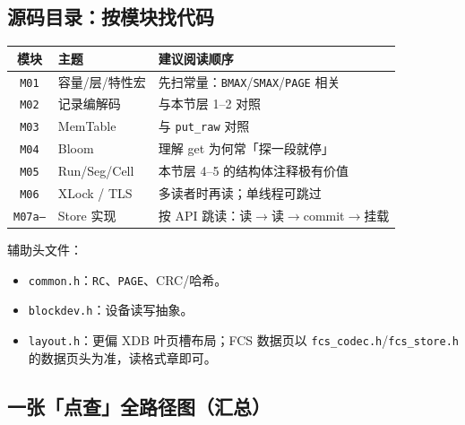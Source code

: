 \subsection{源码目录：按模块找代码}
\label{sec:cd-modules}

\begin{center}
\small
\begin{tabular}{@{}clp{8.4cm}@{}}
\toprule
模块 & 主题 & 建议阅读顺序 \\
\midrule
\texttt{M01} & 容量/层/特性宏 & 先扫常量：\texttt{BMAX}/\texttt{SMAX}/\texttt{PAGE} 相关 \\
\texttt{M02} & 记录编解码 & 与本节层 1--2 对照 \\
\texttt{M03} & MemTable & 与 \texttt{put\_raw} 对照 \\
\texttt{M04} & Bloom & 理解 get 为何常「探一段就停」 \\
\texttt{M05} & Run/Seg/Cell & 本节层 4--5 的结构体注释极有价值 \\
\texttt{M06} & XLock / TLS & 多读者时再读；单线程可跳过 \\
\texttt{M07a--} & Store 实现 & 按 API 跳读：读$\to$读$\to$commit$\to$挂载 \\
\bottomrule
\end{tabular}
\end{center}

辅助头文件：
\begin{itemize}[leftmargin=1.4em]
  \item \texttt{common.h}：\texttt{RC}、\texttt{PAGE}、CRC/哈希。
  \item \texttt{blockdev.h}：设备读写抽象。
  \item \texttt{layout.h}：更偏 XDB 叶页槽布局；FCS 数据页以 \texttt{fcs\_codec.h}/\texttt{fcs\_store.h} 的数据页头为准，读格式章即可。
\end{itemize}

\subsection{一张「点查」全路径图（汇总）}
\label{sec:cd-getfig}

